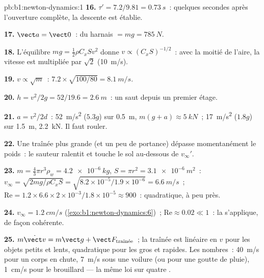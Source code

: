 \begin{solution}{pb:b1:newton-dynamics:1}
\textbf{16.} $\tau' = 7.2/9.81 = \qty{0.73}{s}$~: quelques secondes après
l'ouverture complète, la descente est établie.

\textbf{17.} $\vect a = \vect 0$~:  du harnais $= mg = \qty{785}{N}$.

\textbf{18.} L'équilibre $mg = \tfrac12\rho C_xSv^2$ donne $v \propto (C_xS)^{-1/2}$~:
avec la moitié de l'aire, la vitesse est multipliée par $\sqrt2$ (\qty{10}{m/s}).

\textbf{19.} $v \propto \sqrt m$~: $7.2 \times \sqrt{100/80} = \qty{8.1}{m/s}$.

\textbf{20.} $h = v^2/2g = 52/19.6 = \qty{2.6}{m}$~: un saut depuis un
premier étage.

\textbf{21.} $a = v^2/2d$~: \qty{52}{m/s^2} ($5.3g$) sur \qty{0.5}{m},
 $m(g + a) \approx \qty{5}{kN}$~; \qty{17}{m/s^2} ($1.8g$) sur
\qty{1.5}{m}, \qty{2.2}{kN}. Il faut rouler.

\textbf{22.} Une traînée plus grande (et un peu de portance) dépasse
momentanément le poids~: le sauteur ralentit et touche le sol
au-dessous de $v_\infty'$.

\textbf{23.} $m = \tfrac43\pi r^3\rho_w = \qty{4.2e-6}{kg}$, $S = \pi r^2 =
\qty{3.1e-6}{m^2}$~: $v_\infty = \sqrt{2mg/\rho C_xS} = \sqrt{8.2\times10^{-5}/
1.9\times10^{-6}} = \qty{6.6}{m/s}$~; $\mathrm{Re} = 1.2 \times 6.6 \times
2\times10^{-3}/1.8\times10^{-5} \approx 900$~: quadratique, à peu près.

\textbf{24.} $v_\infty = \qty{1.2}{cm/s}$ (\cref{exo:b1:newton-dynamics:6})~;
$\mathrm{Re} \approx 0.02 \ll 1$~: la  s'applique, de façon cohérente.

\textbf{25.} $m\dot{\vect v} = m\vect g + \vect F_{\text{traînée}}$~; la
traînée est linéaire en $v$ pour les objets petits et lents, quadratique
pour les gros et rapides. Les nombres~: \qty{40}{m/s} pour un corps en
chute, \qty{7}{m/s} sous une voilure (ou pour une goutte de pluie),
\qty{1}{cm/s} pour le brouillard --- la même loi sur quatre .
\end{solution}

